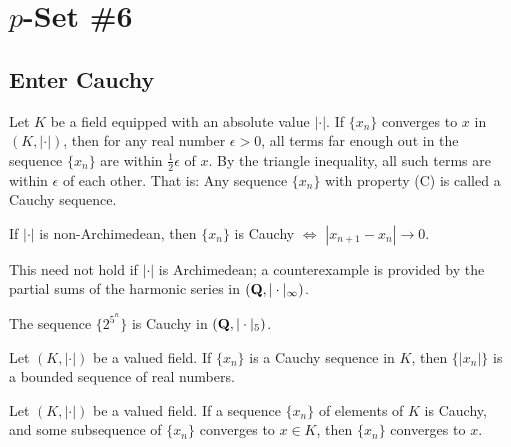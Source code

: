 \chapter*{$p$-Set \#6}


\section*{Enter Cauchy}
Let $K$ be a field equipped with an absolute value $|\cdot|$. If $\{x_n\}$ converges to $x$ in $(K,|\cdot|)$, then for any real number $\epsilon > 0$, all terms far enough out in the sequence $\{x_n\}$ are within $\frac{1}{2}\epsilon$ of $x$. By the triangle inequality, all such terms are within $\epsilon$ of each other. That is:
\vskip 0.05in
\vskip 0.05in
Any sequence $\{x_n\}$ with property (C) is called a \textsf{Cauchy sequence}.

\begin{prob}\label{prob:68} If $|\cdot|$ is non-Archimedean, then $\{x_n\}$ is Cauchy $\Longleftrightarrow$ $|x_{n+1}-x_n| \to 0$. 

{\scriptsize This need not hold if $|\cdot|$ is Archimedean; a counterexample is provided by the partial sums of the harmonic series in $(\mathbf{Q},|\cdot|_{\infty})$.}
\end{prob}

\begin{prob}\label{prob:70} The sequence $\{2^{5^n}\}$ is Cauchy in $(\mathbf{Q}, |\cdot|_5)$. 
\end{prob}


\begin{prob}\label{prob:68point5} Let $(K,|\cdot|)$ be a valued field. If $\{x_n\}$ is a Cauchy sequence in $K$, then $\{|x_n|\}$ is a bounded sequence of real numbers.
\end{prob}

\begin{prob} \label{prob:69} Let $(K,|\cdot|)$ be a valued field. If a sequence $\{x_n\}$ of elements of $K$ is Cauchy, and some subsequence of $\{x_n\}$ converges to $x \in K$, then $\{x_n\}$ converges to $x$.
\end{prob}

